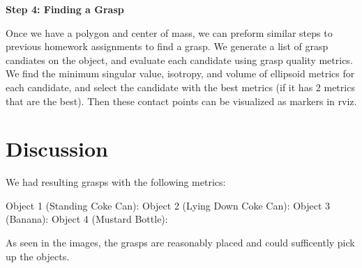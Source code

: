\documentclass[12pt]{article}
\begin{document}
\textbf{Step 4: Finding a Grasp}

Once we have a polygon and center of mass, we can preform similar steps to previous homework assignments to find a grasp. We generate a list of grasp candiates on the object, and evaluate each candidate using grasp quality metrics. We find the minimum singular value, isotropy, and volume of ellipsoid metrics for each candidate, and select the candidate with the best metrics (if it has 2 metrics that are the best). Then these contact points can be visualized as markers in rviz.

\begin{center}
\end{center}

\section*{Discussion}

We had resulting grasps with the following metrics:

Object 1 (Standing Coke Can):
Object 2 (Lying Down Coke Can):
Object 3 (Banana):
Object 4 (Mustard Bottle):

As seen in the images, the grasps are reasonably placed and could sufficently pick up the objects. 
\end{document}
